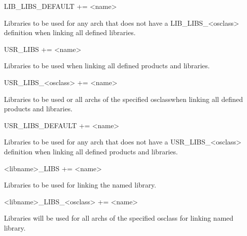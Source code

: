 \begin{description}\item LIB\_LIBS\_DEFAULT += \textless{}name\textgreater{}

\end{description}Libraries to be used for any arch that does not have a LIB\_LIBS\_\textless{}osclass\textgreater{} definition when linking all 
defined libraries.



\begin{description}\item {}USR\_LIBS += \textless{}name\textgreater{}

\end{description}Libraries to be used when linking all defined products and libraries.

\begin{description}\item USR\_LIBS\_\textless{}osclass\textgreater{} += \textless{}name\textgreater{}

\end{description}Libraries to be used or all archs of the specified osclasswhen linking all defined products and libraries.

\begin{description}\item USR\_LIBS\_DEFAULT += \textless{}name\textgreater{}

\end{description}Libraries to be used for any arch that does not have a USR\_LIBS\_\textless{}osclass\textgreater{} definition when linking all 
defined products and libraries.



\begin{description}\item \textless{}libname\textgreater{}\_LIBS += \textless{}name\textgreater{}

\end{description}Libraries to be used for linking the named library.

\begin{description}\item \textless{}libname\textgreater{}\_LIBS\_\textless{}osclass\textgreater{} += \textless{}name\textgreater{}

\end{description}Libraries will be used for all archs of the specified osclass for linking named library.

